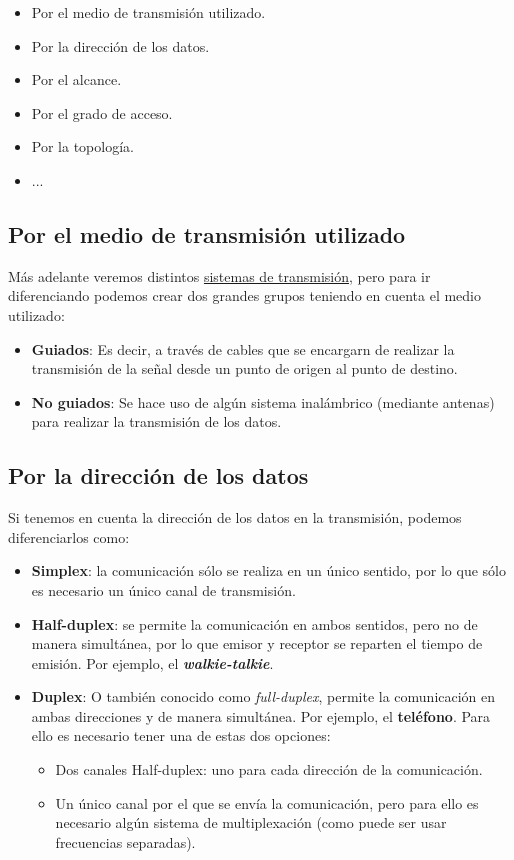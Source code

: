 \begin{itemize}
    \item Por el medio de transmisión utilizado.
    \item Por la dirección de los datos.
    \item Por el alcance.
    \item Por el grado de acceso.
    \item Por la topología.
    \item ...
\end{itemize}

\subsection{Por el medio de transmisión utilizado}
Más adelante veremos distintos \hyperlink{sistemas_transmision}{sistemas de transmisión}, pero para ir diferenciando podemos crear dos grandes grupos teniendo en cuenta el medio utilizado:

\begin{itemize}
    \item \textbf{Guiados}: Es decir, a través de cables que se encargarn de realizar la transmisión de la señal desde un punto de origen al punto de destino.

    \item \textbf{No guiados}: Se hace uso de algún sistema inalámbrico (mediante antenas) para realizar la transmisión de los datos.
\end{itemize}


\subsection{Por la dirección de los datos}
Si tenemos en cuenta la dirección de los datos en la transmisión, podemos diferenciarlos como:

\begin{itemize}
    \item \textbf{Simplex}: la comunicación sólo se realiza en un único sentido, por lo que sólo es necesario un único canal de transmisión.

    \item \textbf{Half-duplex}: se permite la comunicación en ambos sentidos, pero no de manera simultánea, por lo que emisor y receptor se reparten el tiempo de emisión. Por ejemplo, el \textit{\textbf{walkie-talkie}}.

    \item \textbf{Duplex}: O también conocido como \textit{full-duplex}, permite la comunicación en ambas direcciones y de manera simultánea. Por ejemplo, el \textbf{teléfono}. Para ello es necesario tener una de estas dos opciones:
    \begin{itemize}
        \item Dos canales Half-duplex: uno para cada dirección de la comunicación.
        \item Un único canal por el que se envía la comunicación, pero para ello es necesario algún sistema de multiplexación (como puede ser usar frecuencias separadas).
    \end{itemize}
\end{itemize}


